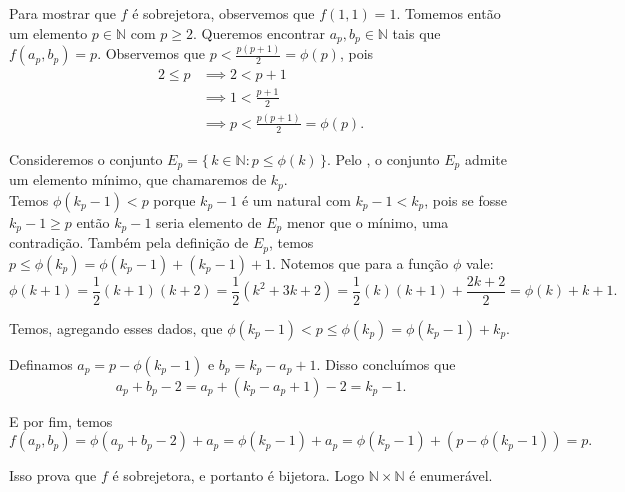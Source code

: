 \documentclass[../main.tex]{subfiles}
\begin{document}
\begin{dem}
    Para mostrar que $f$ é sobrejetora, observemos que $f(1,1) = 1$. Tomemos então um elemento $p \in \mathbb{N}$ com 
    $p \geq 2$. Queremos encontrar $a_p, b_p \in \mathbb{N}$ tais que $f(a_p,b_p) = p$.
    Observemos que $p < \frac{p(p+1)}{2} = \phi(p)$, pois
    \begin{align*}
        2 \leq p &\implies 2 < p+1 \\
        & \implies 1 < \frac{p+1}{2} \\
        & \implies p < \frac{p(p+1)}{2} =\phi(p). 
    \end{align*}
    
    Consideremos o conjunto $E_p = \{\,k \in \mathbb{N} : p \leq \phi(k) \,\}$.
    Pelo , o conjunto $E_p$ admite um elemento mínimo, que chamaremos de $k_p$. \\
    Temos $\phi(k_p - 1) < p$ porque $k_p - 1$ é um natural com $k_p - 1 < k_p$, pois se fosse $k_p - 1 \geq p$ então $k_p - 1$ seria elemento de $E_p$ menor que o mínimo, uma contradição.
    Também pela definição de $E_p$, temos $p \leq \phi(k_p) = \phi(k_p - 1) + (k_p - 1)+1$. Notemos que para a função $\phi$ vale:
    \[ \phi(k+1) = \frac{1}{2}(k+1)(k+2) = \frac{1}{2}(k^2 + 3k + 2) = \frac{1}{2}(k)(k+1)+\frac{2k+2}{2} = \phi(k) + k+1. \]
    
    Temos, agregando esses dados, que $\phi(k_p - 1) < p \leq \phi(k_p) = \phi(k_p-1) + k_p$.
    
    Definamos $a_p = p - \phi(k_p-1)$ e $b_p = k_p - a_p + 1$. Disso concluímos que 
    \[ a_p + b_p - 2 = a_p + (k_p - a_p + 1) - 2 = k_p - 1. \]
    
    E por fim, temos
    \[f(a_p,b_p) = \phi(a_p+b_p-2) + a_p = \phi(k_p-1) + a_p  = \phi(k_p - 1) + (p - \phi(k_p-1))= p .\]
    
    Isso prova que $f$ é sobrejetora, e portanto é bijetora. Logo $\mathbb{N} \times \mathbb{N}$ é enumerável. 
\end{dem}
\end{document}
